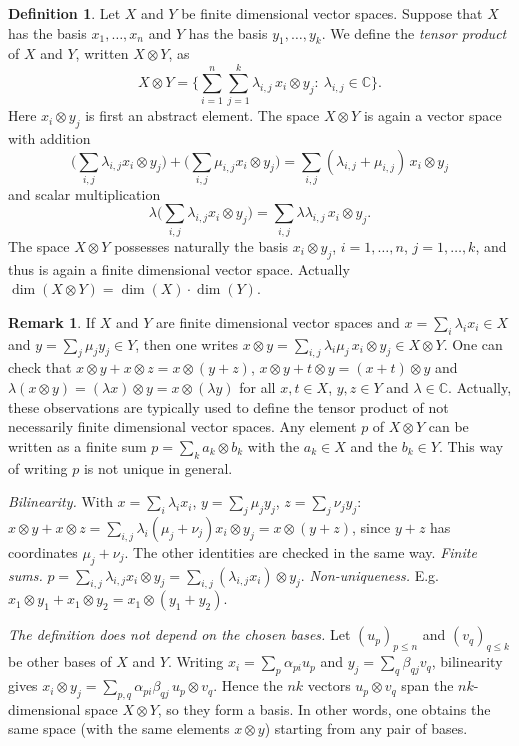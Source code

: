 \documentclass[11pt,a4paper]{article}
\numberwithin{equation}{section}
\newcommand{\C}{\mathbb{C}}
\theoremstyle{plain}
\theoremstyle{definition}
\newtheorem{definition}[theorem]{Definition}
\newtheorem{remark}[theorem]{Remark}
\theoremstyle{plain}
\theoremstyle{definition}
\begin{document}
\begin{definition}\label{def:tensor}
Let $X$ and $Y$ be finite dimensional vector spaces. Suppose that $X$ has the basis
$x_1,\dots,x_n$ and $Y$ has the basis $y_1,\dots,y_k$. We define the \emph{tensor product}
of $X$ and $Y$, written $X\otimes Y$, as
\[
X\otimes Y=\Big\{\sum_{i=1}^n\sum_{j=1}^k\lambda_{i,j}\,x_i\otimes y_j:\ \lambda_{i,j}\in\C\Big\}.
\]
Here $x_i\otimes y_j$ is first an abstract element. The space $X\otimes Y$ is again a vector
space with addition
\[
\Big(\sum_{i,j}\lambda_{i,j}x_i\otimes y_j\Big)+\Big(\sum_{i,j}\mu_{i,j}x_i\otimes y_j\Big)
=\sum_{i,j}(\lambda_{i,j}+\mu_{i,j})\,x_i\otimes y_j
\]
and scalar multiplication
\[
\lambda\Big(\sum_{i,j}\lambda_{i,j}x_i\otimes y_j\Big)=\sum_{i,j}\lambda\lambda_{i,j}\,x_i\otimes y_j .
\]
The space $X\otimes Y$ possesses naturally the basis $x_i\otimes y_j$, $i=1,\dots,n$,
$j=1,\dots,k$, and thus is again a finite dimensional vector space. Actually
$\dim(X\otimes Y)=\dim(X)\cdot\dim(Y)$.
\end{definition}

\begin{remark}\label{rem:bilin}
If $X$ and $Y$ are finite dimensional vector spaces and $x=\sum_i\lambda_ix_i\in X$ and
$y=\sum_j\mu_jy_j\in Y$, then one writes
$x\otimes y=\sum_{i,j}\lambda_i\mu_j\,x_i\otimes y_j\in X\otimes Y$. One can check that
$x\otimes y+x\otimes z=x\otimes(y+z)$, $x\otimes y+t\otimes y=(x+t)\otimes y$ and
$\lambda(x\otimes y)=(\lambda x)\otimes y=x\otimes(\lambda y)$ for all $x,t\in X$,
$y,z\in Y$ and $\lambda\in\C$. Actually, these observations are typically used to define
the tensor product of not necessarily finite dimensional vector spaces. Any element $p$ of
$X\otimes Y$ can be written as a finite sum $p=\sum_ka_k\otimes b_k$ with the $a_k\in X$ and
the $b_k\in Y$. This way of writing $p$ is not unique in general.
\end{remark}

\begin{addition}
\emph{Bilinearity.} With $x=\sum_i\lambda_ix_i$, $y=\sum_j\mu_jy_j$, $z=\sum_j\nu_jy_j$:
$x\otimes y+x\otimes z=\sum_{i,j}\lambda_i(\mu_j+\nu_j)x_i\otimes y_j=x\otimes(y+z)$, since
$y+z$ has coordinates $\mu_j+\nu_j$. The other identities are checked in the same way.
\emph{Finite sums.} $p=\sum_{i,j}\lambda_{i,j}x_i\otimes y_j=\sum_{i,j}(\lambda_{i,j}x_i)\otimes y_j$.
\emph{Non-uniqueness.} E.g.\ $x_1\otimes y_1+x_1\otimes y_2=x_1\otimes(y_1+y_2)$.

\emph{The definition does not depend on the chosen bases.} Let $(u_p)_{p\le n}$ and
$(v_q)_{q\le k}$ be other bases of $X$ and $Y$. Writing $x_i=\sum_p\alpha_{pi}u_p$ and
$y_j=\sum_q\beta_{qj}v_q$, bilinearity gives
$x_i\otimes y_j=\sum_{p,q}\alpha_{pi}\beta_{qj}\,u_p\otimes v_q$. Hence the $nk$ vectors
$u_p\otimes v_q$ span the $nk$-dimensional space $X\otimes Y$, so they form a basis. In
other words, one obtains the same space (with the same elements $x\otimes y$) starting
from any pair of bases.
\end{addition}
\end{document}
